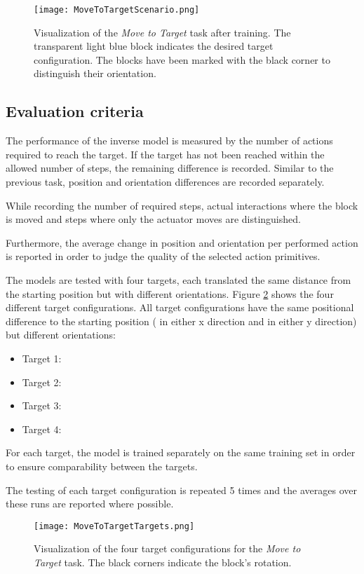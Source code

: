 \begin{figure}
\centering
\texttt{[image: MoveToTargetScenario.png]}
\caption{Visualization of the \textit{Move to Target} task after training. The transparent light blue block indicates the desired target configuration. The blocks have been marked with the black corner to distinguish their orientation.}
\label{fig:moveToTargetScenario}
\end{figure}

\subsection{Evaluation criteria}

The performance of the inverse model is measured by the number of actions required to reach the target. If the target has not been reached within the allowed number of steps, the remaining difference is recorded. Similar to the previous task, position and orientation differences are recorded separately.

While recording the number of required steps, actual interactions where the block is moved and steps where only the actuator moves are distinguished.

Furthermore, the average change in position and orientation per performed action is reported in order to judge the quality of the selected action primitives.

The models are tested with four targets, each translated the same distance from the starting position but with different orientations. Figure \ref{fig:targetPositions} shows the four different target configurations. All target configurations have the same positional difference to the starting position ( in either x direction and  in either y direction) but different orientations: 
\begin{itemize}
\item Target 1: 
\item Target 2: 
\item Target 3:  
\item Target 4: 
\end{itemize}
For each target, the model is trained separately on the same training set in order to ensure comparability between the targets.

The testing of each target configuration is repeated 5 times and the averages over these runs are reported where possible.

\begin{figure}
\centering
\texttt{[image: MoveToTargetTargets.png]}
\caption{Visualization of the four target configurations for the \textit{Move to Target} task. The black corners indicate the block's rotation.}
\label{fig:targetPositions}
\end{figure}

